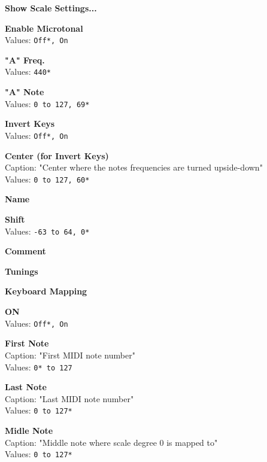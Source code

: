 \documentclass[
 11pt,
 twoside,
 a4paper,
 headinclude,
 footinclude,
 final                                 %
]{article}
\begin{document}
\begin{enumber}
\begin{enumber}
\begin{enumber}
         \item \textbf{Show Scale Settings...}
         \begin{enumber}
            \item \textbf{Enable Microtonal} \\
               Values: \texttt{Off*, On}
            \item \textbf{"A" Freq.} \\
               Values: \texttt{440*}
            \item \textbf{"A" Note} \\
               Values: \texttt{0 to 127, 69*}
            \item \textbf{Invert Keys} \\
               Values: \texttt{Off*, On}
            \item \textbf{Center (for Invert Keys)} \\
               Caption: "Center where the notes frequencies are turned upside-down" \\
               Values: \texttt{0 to 127, 60*}
            \item \textbf{Name}
            \item \textbf{Shift} \\
               Values: \texttt{-63 to 64, 0*}
            \item \textbf{Comment}
            \item \textbf{Tunings}
            \item \textbf{Keyboard Mapping}
            \begin{enumber}
               \item \textbf{ON} \\
                  Values: \texttt{Off*, On}
               \item \textbf{First Note} \\
                  Caption: "First MIDI note number" \\
                  Values: \texttt{0* to 127}
               \item \textbf{Last Note} \\
                  Caption: "Last MIDI note number" \\
                  Values: \texttt{0 to 127*}
               \item \textbf{Midle Note} \\
                  Caption: "Middle note where scale degree 0 is mapped to" \\
                  Values: \texttt{0 to 127*}

\end{enumber}
\end{enumber}
\end{enumber}
\end{enumber}
\end{enumber}
\end{document}
